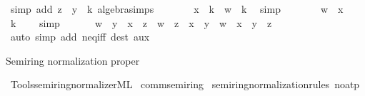 \begin{isabellebody}
\ {\isacharparenleft}{\kern0pt}simp\ add{\isacharcolon}{\kern0pt}\ {\isacartoucheopen}z\ {\isacharequal}{\kern0pt}\ y\ {\isacharplus}{\kern0pt}\ k{\isacartoucheclose}\ algebra{\isacharunderscore}{\kern0pt}simps{\isacharparenright}{\kern0pt}\isanewline
\ \ \ \ \isamarkupfalse%
\ \isamarkupfalse%
\ {\isachardoublequoteopen}x\ {\isacharasterisk}{\kern0pt}\ k\ {\isacharequal}{\kern0pt}\ w\ {\isacharasterisk}{\kern0pt}\ k{\isachardoublequoteclose}\ \isamarkupfalse%
\ simp\isanewline
\ \ \ \ \isamarkupfalse%
\ \isamarkupfalse%
\ {\isachardoublequoteopen}w\ {\isacharequal}{\kern0pt}\ x{\isachardoublequoteclose}\ \isamarkupfalse%
\ {\isacartoucheopen}k\ {\isasymnoteq}\ {}{\isacartoucheclose}\ \isamarkupfalse%
\ simp\isanewline
\ \ \isamarkupfalse%
\isanewline
\ \ \isamarkupfalse%
\ {\isachardoublequoteopen}w\ {\isacharasterisk}{\kern0pt}\ y\ {\isacharplus}{\kern0pt}\ x\ {\isacharasterisk}{\kern0pt}\ z\ {\isacharequal}{\kern0pt}\ w\ {\isacharasterisk}{\kern0pt}\ z\ {\isacharplus}{\kern0pt}\ x\ {\isacharasterisk}{\kern0pt}\ y\ {\isasymlongleftrightarrow}\ w\ {\isacharequal}{\kern0pt}\ x\ {\isasymor}\ y\ {\isacharequal}{\kern0pt}\ z{\isachardoublequoteclose}\isanewline
\ \ \ \ \isamarkupfalse%
\ {\isacharparenleft}{\kern0pt}auto\ simp\ add{\isacharcolon}{\kern0pt}\ neq{\isacharunderscore}{\kern0pt}iff\ dest{\isacharbang}{\kern0pt}{\isacharcolon}{\kern0pt}\ aux{\isacharparenright}{\kern0pt}\isanewline
{}\isamarkupfalse%
%
\endisatagproof
{\isafoldproof}%
%
\isadelimproof
%
\endisadelimproof
%
\begin{isamarkuptext}%
Semiring normalization proper%
\end{isamarkuptext}\isamarkuptrue%
%
\isadelimML
%
\endisadelimML
%
\isatagML
{}\isamarkupfalse%
\ {\isacartoucheopen}Tools{\isacharslash}{\kern0pt}semiring{\isacharunderscore}{\kern0pt}normalizer{\isachardot}{\kern0pt}ML{\isacartoucheclose}%
\endisatagML
{\isafoldML}%
%
\isadelimML
%
\endisadelimML
\isanewline
\isanewline
{}\isamarkupfalse%
\ comm{\isacharunderscore}{\kern0pt}semiring{\isacharunderscore}{\kern0pt}{}\isanewline
{}\isanewline
\isanewline
{}\isamarkupfalse%
\ semiring{\isacharunderscore}{\kern0pt}normalization{\isacharunderscore}{\kern0pt}rules\ {\isacharbrackleft}{\kern0pt}no{\isacharunderscore}{\kern0pt}atp{\isacharbrackright}{\kern0pt}{\isacharcolon}{\kern0pt}\isanewline

\end{isabellebody}
